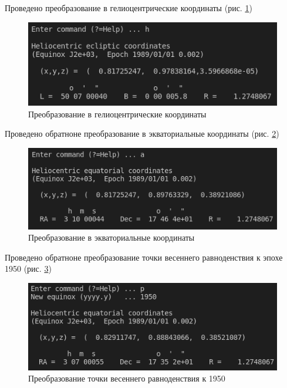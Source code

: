 \documentclass[14pt,a4paper]{extarticle}%
\begin{document}
\clearpage

Проведено преобразование в гелиоцентрические координаты (рис. \ref{fig:helio})

\begin{figure}[H]
  \centering
  \includegraphics[scale=1.0]{helio.png}
  \caption{Преобразование в гелиоцентрические координаты}
  \label{fig:helio}
\end{figure}

Проведено обратноне преобразование в экваториальные координаты (рис. \ref{fig:equ})

\begin{figure}[H]
  \centering
  \includegraphics[scale=1.0]{equatorial.png}
  \caption{Преобразование в экваториальные координаты}
  \label{fig:equ}
\end{figure}

\clearpage

Проведено обратноне преобразование точки весеннего равноденствия к эпохе 1950
(рис. \ref{fig:old_equinox})

\begin{figure}[H]
  \centering
  \includegraphics[scale=1.0]{old_equinox.png}
  \caption{Преобразование точки весеннего равноденствия к 1950}
  \label{fig:old_equinox}
\end{figure}
\end{document}

